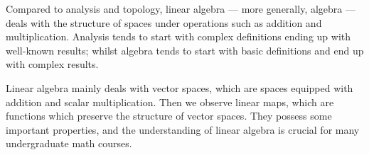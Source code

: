 \label{chap:linalg}

Compared to analysis and topology,
linear algebra --- more generally, algebra ---
deals with the structure of spaces
under operations such as addition and multiplication.
Analysis tends to
start with complex definitions ending up with well-known results;
whilst algebra tends to
start with basic definitions and end up with complex results.

Linear algebra mainly deals with vector spaces,
which are spaces equipped with addition and scalar multiplication.
Then we observe linear maps,
which are functions which preserve the structure of vector spaces.
They possess some important properties,
and the understanding of linear algebra is crucial
for many undergraduate math courses.